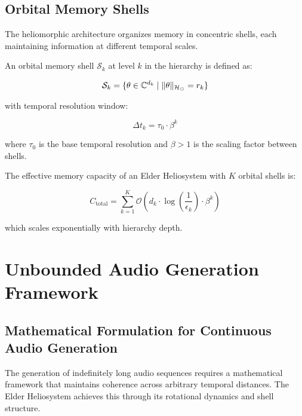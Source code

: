 \subsection{Orbital Memory Shells}

The heliomorphic architecture organizes memory in concentric shells, each maintaining information at different temporal scales.

\begin{definition}
An orbital memory shell $\mathcal{S}_k$ at level $k$ in the hierarchy is defined as:

\begin{equation}
\mathcal{S}_k = \{\theta \in \mathbb{C}^{d_k} \mid \|\theta\|_{\mathcal{H}_{\odot}} = r_k\}
\end{equation}

with temporal resolution window:

\begin{equation}
\Delta t_k = \tau_0 \cdot \beta^k
\end{equation}

where $\tau_0$ is the base temporal resolution and $\beta > 1$ is the scaling factor between shells.
\end{definition}

\begin{theorem}
The effective memory capacity of an Elder Heliosystem with $K$ orbital shells is:

\begin{equation}
C_{\text{total}} = \sum_{k=1}^K \mathcal{O}(d_k \cdot \log(\frac{1}{\epsilon_k}) \cdot \beta^k)
\end{equation}

which scales exponentially with hierarchy depth.
\end{theorem}

\section{Unbounded Audio Generation Framework}

\subsection{Mathematical Formulation for Continuous Audio Generation}

The generation of indefinitely long audio sequences requires a mathematical framework that maintains coherence across arbitrary temporal distances. The Elder Heliosystem achieves this through its rotational dynamics and shell structure.

